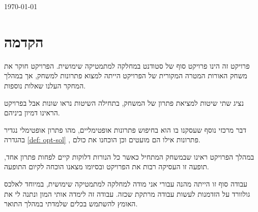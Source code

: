 \documentclass[12pt,leqno]{article}
\theoremstyle{theoremdd}
\begin{document}
\begin{titlepage}

{\large \today} \\[2cm] %


\vfill %

\end{titlepage}
\tableofcontents

\newpage
\section{הקדמה}
פרויקט זה הינו פרויקט סוף של סטודנט במחלקה למתמטיקה שימושית.
הפרויקט 
חוקר את משחק האורות 
המטרה המקורית של הפרויקט הייתה למצוא פתרונות למשחק, אך במהלך המחקר
העלנו שאלות נוספות.

נציג שתי שיטות למציאת פתרון של המשחק,
בתחילה השיטות נראו שונות אבל בפרויקט הראינו דמיון ביניהם.

דבר מרכזי נוסף שעסקנו בו הוא בחיפוש פתרונות אופטימליים,
 מהו פתרון אופטימלי נגדיר בהגדרה
 \ref{def: opt-sol}
 , פתרונות אילו הם מועטים וכן הוכחנו את כולם.

במהלך הפרויקט ראינו שבמשחק המתחיל כאשר כל הנורות דלוקות קיים לפחות פתרון אחד,
תופעה זו העסיקה רבות את הפרויקט ובסיומו מצאנו הוכחה
לקיום התופעה.

עבודה סוף זו הייתה מהנה עבורי אני מודה למחלקה
למתמטיקה שימושית,
במיוחד לאלכס גולוורד על הזדמנות לעשות 
עבודה מרתקת שכזה.
עבודה זה לימדה אותי המון ונתנה לי את האומץ להשתמש בכלים שלמדתי במהלך התואר.
\newpage
\end{document}
